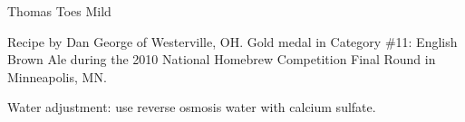 \begin{recipe}{Thomas Toes Mild}

\begin{aboutblock}
Recipe by Dan George of Westerville, OH. Gold medal in Category \#11: English Brown
Ale during the 2010 National Homebrew Competition Final Round in Minneapolis, MN.
\sourceaha
\end{aboutblock}


\begin{methodandtiming}

\begin{mashsteps}
\end{mashsteps}

\begin{fermentationsteps}
\end{fermentationsteps}

\begin{directions}
Water adjustment: use reverse osmosis water with  calcium sulfate.
\end{directions}

\end{methodandtiming}

\recipebreak

\begin{ingredientsblock}

\begin{malts}
\end{malts}

\begin{hops}
\end{hops}


\end{ingredientsblock}

\end{recipe}
